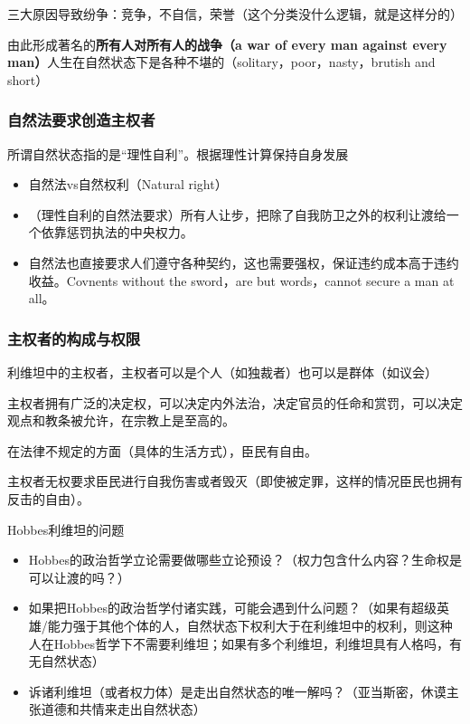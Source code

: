 三大原因导致纷争：竞争，不自信，荣誉（这个分类没什么逻辑，就是这样分的）

由此形成著名的\textbf{所有人对所有人的战争（a war of every man against every man）}人生在自然状态下是各种不堪的（solitary，poor，nasty，brutish and short）

\subsubsection{自然法要求创造主权者}

所谓自然状态指的是“理性自利”。根据理性计算保持自身发展

\begin{itemize}
    \item 自然法vs自然权利（Natural right）
    \item （理性自利的自然法要求）所有人让步，把除了自我防卫之外的权利让渡给一个依靠惩罚执法的中央权力。
    \item 自然法也直接要求人们遵守各种契约，这也需要强权，保证违约成本高于违约收益。Covnents without the sword，are but words，cannot secure a man at all。
\end{itemize}

\subsubsection{主权者的构成与权限}

利维坦中的主权者，主权者可以是个人（如独裁者）也可以是群体（如议会）

主权者拥有广泛的决定权，可以决定内外法治，决定官员的任命和赏罚，可以决定观点和教条被允许，在宗教上是至高的。

在法律不规定的方面（具体的生活方式），臣民有自由。

主权者无权要求臣民进行自我伤害或者毁灭（即使被定罪，这样的情况臣民也拥有反击的自由）。

\begin{fancybox}{Hobbes利维坦的问题}
    \begin{itemize}
        \item Hobbes的政治哲学立论需要做哪些立论预设？（权力包含什么内容？生命权是可以让渡的吗？）
        \item 如果把Hobbes的政治哲学付诸实践，可能会遇到什么问题？（如果有超级英雄/能力强于其他个体的人，自然状态下权利大于在利维坦中的权利，则这种人在Hobbes哲学下不需要利维坦；如果有多个利维坦，利维坦具有人格吗，有无自然状态）
        \item 诉诸利维坦（或者权力体）是走出自然状态的唯一解吗？（亚当斯密，休谟主张道德和共情来走出自然状态）
    \end{itemize}
\end{fancybox}
